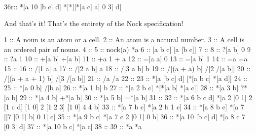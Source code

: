 \begin{code}
36r::    *[a 10 [b c] d]  *[*[[*[a c] a] 0 3] d]
\end{code}

And that's it! That's the entirety of the Nock specification!

\begin{code}
1  ::    A noun is an atom or a cell.
2  ::    An atom is a natural number.
3  ::    A cell is an ordered pair of nouns.
4  ::
5  ::    nock(a)          *a
6  ::    [a b c]          [a [b c]]
7  ::
8  ::    ?[a b]           0
9  ::    ?a               1
10 ::    +[a b]           +[a b]
11 ::    +a               1 + a
12 ::    =[a a]           0
13 ::    =[a b]           1
14 ::    =a               =a
15 ::
16 ::    /[1 a]           a
17 ::    /[2 a b]         a
18 ::    /[3 a b]         b
19 ::    /[(a + a) b]     /[2 /[a b]]
20 ::    /[(a + a + 1) b] /[3 /[a b]]
21 ::    /a               /a
22 ::
23 ::    *[a [b c] d]     [*[a b c] *[a d]]
24 ::
25 ::    *[a 0 b]         /[b a]
26 ::    *[a 1 b]         b
27 ::    *[a 2 b c]       *[*[a b] *[a c]]
28 ::    *[a 3 b]         ?*[a b]
29 ::    *[a 4 b]         +*[a b]
30 ::    *[a 5 b]         =*[a b]
31 ::
32 ::    *[a 6 b c d]     *[a 2 [0 1] 2 [1 c d] [1 0] 2 [1 2 3] [1 0] 4 4 b]
33 ::    *[a 7 b c]       *[a 2 b 1 c]
34 ::    *[a 8 b c]       *[a 7 [[7 [0 1] b] 0 1] c]
35 ::    *[a 9 b c]       *[a 7 c 2 [0 1] 0 b]
36 ::    *[a 10 [b c] d]  *[a 8 c 7 [0 3] d]
37 ::    *[a 10 b c]      *[a c]
38 ::
39 ::    *a               *a
\end{code}
